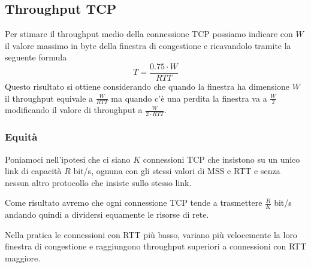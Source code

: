 \subsection{Throughput TCP}
Per stimare il throughput medio della connessione TCP possiamo indicare
con $W$ il valore massimo in byte della finestra di congestione e 
ricavandolo tramite la seguente formula
\[ T = \frac{0.75 \cdot W}{RTT} \]
Questo risultato si ottiene considerando che quando la finestra ha 
dimensione $W$ il throughput equivale a $\frac{W}{RTT}$ ma quando c'è 
una perdita la finestra va a $\frac{W}{2}$ modificando il valore di 
throughput a $\frac{W}{2 \cdot RTT}$.

\subsubsection{Equità}
Poniamoci nell'ipotesi che ci siano $K$ connessioni TCP che insistono 
su un unico link di capacità $R$ bit/s, ognuna con gli stessi valori di
MSS e RTT e senza nessun altro protocollo che insiste sullo stesso 
link.

Come risultato avremo che ogni connessione TCP tende a trasmettere 
$\frac{R}{K}$ bit/s andando quindi a dividersi equamente le risorse 
di rete.

Nella pratica le connessioni con RTT più basso, variano più velocemente
la loro finestra di congestione e raggiungono throughput superiori a 
connessioni con RTT maggiore.
